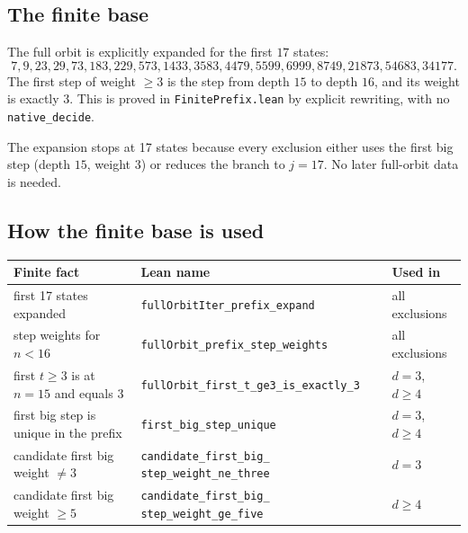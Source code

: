 \subsection{The finite base}

The full orbit is explicitly expanded for the first $17$ states:
\begin{equation*}
  7,9,23,29,73,183,229,573,1433,3583,4479,5599,6999,8749,21873,54683,34177.
\end{equation*}
The first step of weight $\ge3$ is the step from depth $15$ to depth
$16$, and its weight is exactly $3$.  This is proved in
\texttt{FinitePrefix.lean} by explicit rewriting, with no
\texttt{native\_decide}.

The expansion stops at 17 states because every exclusion either uses
the first big step (depth $15$, weight $3$) or reduces the branch to
$j=17$.  No later full-orbit data is needed.

\subsection{How the finite base is used}

\begin{center}
\small
\begin{tabular}{@{}p{}p{}p{}@{}}
\toprule
Finite fact & Lean name & Used in \\
\midrule
first 17 states expanded &
  \texttt{fullOrbitIter\_\allowbreak prefix\_expand} & all exclusions \\
step weights for $n<16$ &
  \texttt{fullOrbit\_\allowbreak prefix\_step\_weights} & all exclusions \\
first $t\ge3$ is at $n=15$ and equals $3$ &
  \texttt{fullOrbit\_\allowbreak first\_t\_ge3\_is\_exactly\_3} & $d=3$, $d\ge4$ \\
first big step is unique in the prefix &
  \texttt{first\_\allowbreak big\_step\_unique} & $d=3$, $d\ge4$ \\
candidate first big weight $\ne3$ &
  \texttt{candidate\_\allowbreak first\_\allowbreak big\_\allowbreak
  step\_\allowbreak weight\_\allowbreak ne\_three} & $d=3$ \\
candidate first big weight $\ge5$ &
  \texttt{candidate\_\allowbreak first\_\allowbreak big\_\allowbreak
  step\_\allowbreak weight\_\allowbreak ge\_five} & $d\ge4$ \\
\bottomrule
\end{tabular}
\end{center}

